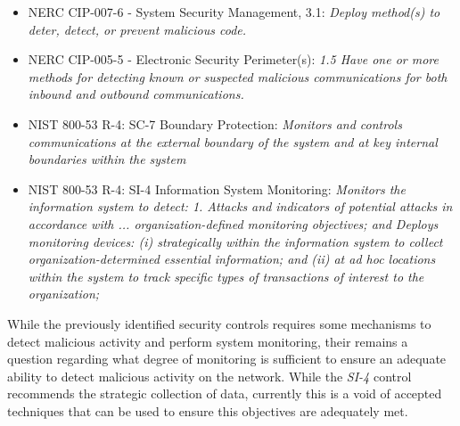 \documentclass[journal]{IEEEtran}
\begin{document}
\begin{itemize}
\item  NERC CIP-007-6 - System Security Management, 3.1: {\it Deploy method(s) to deter, detect, or prevent malicious code.}
\item  NERC CIP-005-5 - Electronic Security Perimeter(s):  {\it 1.5 Have one or more methods for detecting known or suspected malicious communications for both inbound and outbound communications.}
\item  NIST 800-53 R-4: SC-7 Boundary Protection: {\it  Monitors and controls communications at the external boundary of the system and at key internal boundaries within the system}
\item NIST 800-53 R-4: SI-4 Information System Monitoring: {\it Monitors the information system to detect: 1. Attacks and indicators of potential attacks in accordance with ... organization-defined monitoring objectives; and Deploys monitoring devices: (i) strategically within the information system to collect organization-determined essential information; and (ii) at ad hoc locations within the system to track specific types of transactions of interest to the organization;}
\end{itemize}

While the previously identified security controls requires some mechanisms to detect malicious activity and perform system monitoring, their remains a question regarding what degree of monitoring is sufficient to ensure an adequate ability to detect malicious activity on the network. While the {\it SI-4} control recommends the strategic collection of data, currently this is a void of accepted techniques that can be used to ensure this objectives are adequately met. 


\end{document}
